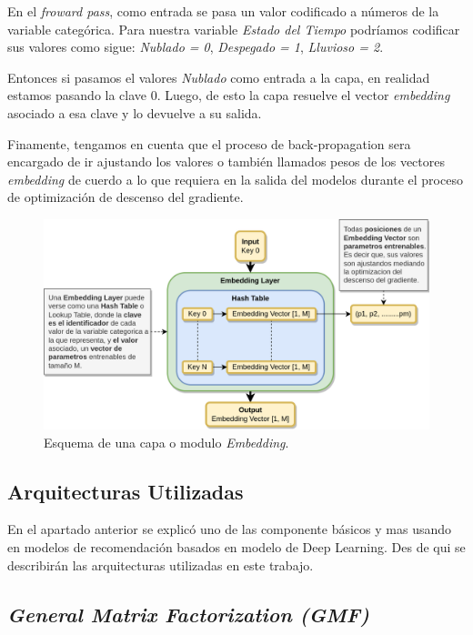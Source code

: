 \documentclass[11pt,a4paper,twoside]{thesis}
\begin{document}
En el \textit{froward pass}, como entrada se pasa un valor codificado a números de la variable categórica. Para nuestra variable \textit{Estado del Tiempo} podríamos codificar sus valores como sigue: \textit{Nublado = 0}, \textit{Despegado = 1}, \textit{Lluvioso = 2}.

Entonces si pasamos el valores \textit{Nublado} como entrada a la capa, en realidad estamos pasando la clave 0. Luego, de esto la capa resuelve el vector \textit{embedding} asociado a esa clave y lo devuelve a su salida.

Finamente, tengamos en cuenta que el proceso de back-propagation sera encargado de ir ajustando los valores o también llamados pesos de los vectores \textit{embedding} de cuerdo a lo que requiera en la salida del modelos durante el proceso de optimización de descenso del gradiente. 

\begin{figure}[ht!]
	\centering
	\includegraphics[width=13cm]{./images/Embedding-Layer.png}
	\caption{Esquema de una capa o modulo \textit{Embedding}.}
	\label{fig:embeddingLayer}
\end{figure}


\clearpage

\subsection{Arquitecturas Utilizadas}

En el apartado anterior se explicó uno de las componente básicos y mas usando en modelos de recomendación basados en modelo de Deep Learning. Des de qui se describirán las arquitecturas utilizadas en este trabajo.

\subsection{\textit{General Matrix Factorization (GMF)}}
\end{document}
